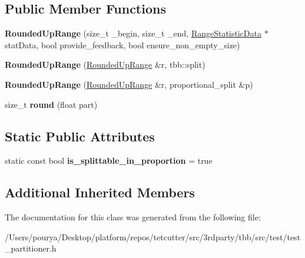\subsection*{Public Member Functions}
\begin{DoxyCompactItemize}
\item 
\hypertarget{classtest__partitioner__utils_1_1TestRanges_1_1RoundedUpRange_a7d9e9c7f77787b2a7508db67771f1d05}{}{\bfseries Rounded\+Up\+Range} (size\+\_\+t \+\_\+begin, size\+\_\+t \+\_\+end, \hyperlink{structtest__partitioner__utils_1_1RangeStatisticData}{Range\+Statistic\+Data} $\ast$stat\+Data, bool provide\+\_\+feedback, bool ensure\+\_\+non\+\_\+empty\+\_\+size)\label{classtest__partitioner__utils_1_1TestRanges_1_1RoundedUpRange_a7d9e9c7f77787b2a7508db67771f1d05}

\item 
\hypertarget{classtest__partitioner__utils_1_1TestRanges_1_1RoundedUpRange_a100fa2f0d23798783531e7677244b46b}{}{\bfseries Rounded\+Up\+Range} (\hyperlink{classtest__partitioner__utils_1_1TestRanges_1_1RoundedUpRange}{Rounded\+Up\+Range} \&r, tbb\+::split)\label{classtest__partitioner__utils_1_1TestRanges_1_1RoundedUpRange_a100fa2f0d23798783531e7677244b46b}

\item 
\hypertarget{classtest__partitioner__utils_1_1TestRanges_1_1RoundedUpRange_a9cadb72b9e4cf1d6ec0023d9002c54f1}{}{\bfseries Rounded\+Up\+Range} (\hyperlink{classtest__partitioner__utils_1_1TestRanges_1_1RoundedUpRange}{Rounded\+Up\+Range} \&r, proportional\+\_\+split \&p)\label{classtest__partitioner__utils_1_1TestRanges_1_1RoundedUpRange_a9cadb72b9e4cf1d6ec0023d9002c54f1}

\item 
\hypertarget{classtest__partitioner__utils_1_1TestRanges_1_1RoundedUpRange_a460b1b932db29656742d07027bf24b71}{}size\+\_\+t {\bfseries round} (float part)\label{classtest__partitioner__utils_1_1TestRanges_1_1RoundedUpRange_a460b1b932db29656742d07027bf24b71}

\end{DoxyCompactItemize}
\subsection*{Static Public Attributes}
\begin{DoxyCompactItemize}
\item 
\hypertarget{classtest__partitioner__utils_1_1TestRanges_1_1RoundedUpRange_a8189e159c4917582794faa2f88458a92}{}static const bool {\bfseries is\+\_\+splittable\+\_\+in\+\_\+proportion} = true\label{classtest__partitioner__utils_1_1TestRanges_1_1RoundedUpRange_a8189e159c4917582794faa2f88458a92}

\end{DoxyCompactItemize}
\subsection*{Additional Inherited Members}


The documentation for this class was generated from the following file\+:\begin{DoxyCompactItemize}
\item 
/\+Users/pourya/\+Desktop/platform/repos/tetcutter/src/3rdparty/tbb/src/test/test\+\_\+partitioner.\+h\end{DoxyCompactItemize}
